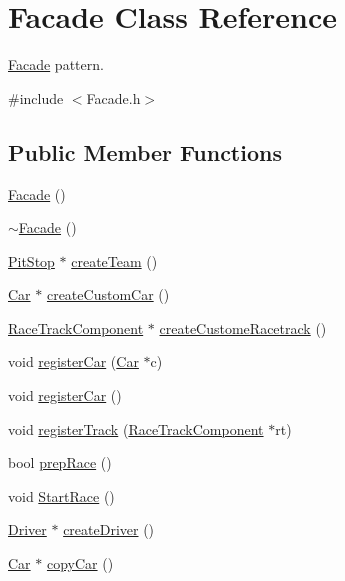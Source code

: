 \hypertarget{class_facade}{}\section{Facade Class Reference}
\label{class_facade}


\mbox{\hyperlink{class_facade}{Facade}} pattern.  




{\ttfamily \#include $<$Facade.\+h$>$}

\subsection*{Public Member Functions}
\begin{DoxyCompactItemize}
\item 
\mbox{\hyperlink{class_facade_a8e0f43c604499d9d603236929b3ac488}{Facade}} ()
\item 
\mbox{\hyperlink{class_facade_a169c5f53bfcb40710dc621f464237c62}{$\sim$\+Facade}} ()
\item 
\mbox{\hyperlink{class_pit_stop}{Pit\+Stop}} $\ast$ \mbox{\hyperlink{class_facade_ad77479711f459ddab775288aa0553d50}{create\+Team}} ()
\item 
\mbox{\hyperlink{class_car}{Car}} $\ast$ \mbox{\hyperlink{class_facade_abdb018bece78a8749c0e9c59fc66b06d}{create\+Custom\+Car}} ()
\item 
\mbox{\hyperlink{class_race_track_component}{Race\+Track\+Component}} $\ast$ \mbox{\hyperlink{class_facade_a63d9892bcb04cf1406be32f548585c47}{create\+Custome\+Racetrack}} ()
\item 
void \mbox{\hyperlink{class_facade_a5afbadb755edf573f9c1a0a05c0f264b}{register\+Car}} (\mbox{\hyperlink{class_car}{Car}} $\ast$c)
\item 
void \mbox{\hyperlink{class_facade_afa1e2d4dcaa42d8dea6b6f0368952911}{register\+Car}} ()
\item 
void \mbox{\hyperlink{class_facade_adedd15b923856bb5876055a3315b0c76}{register\+Track}} (\mbox{\hyperlink{class_race_track_component}{Race\+Track\+Component}} $\ast$rt)
\item 
bool \mbox{\hyperlink{class_facade_a96625dee1b4fab0b7921701cbe164e9e}{prep\+Race}} ()
\item 
void \mbox{\hyperlink{class_facade_a96d2f2e58be5d8a41cebcc23136ad3f9}{Start\+Race}} ()
\item 
\mbox{\hyperlink{class_driver}{Driver}} $\ast$ \mbox{\hyperlink{class_facade_a390cd556494bcb05b4d61e276f14c603}{create\+Driver}} ()
\item 
\mbox{\hyperlink{class_car}{Car}} $\ast$ \mbox{\hyperlink{class_facade_acb151bb025ef7238bc92fe7b474293e3}{copy\+Car}} ()
\end{DoxyCompactItemize}


